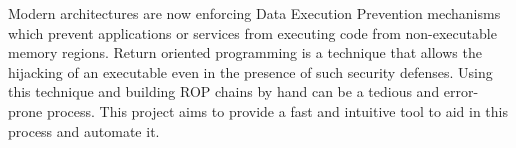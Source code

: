 
Modern architectures are now enforcing Data Execution Prevention mechanisms which prevent applications or services from executing code from non-executable memory regions. Return oriented programming is a technique that allows the hijacking of an executable even in the presence of such security defenses. Using this technique and building ROP chains by hand can be a tedious and error-prone process. This project aims to provide a fast and intuitive tool to aid in this process and automate it.
